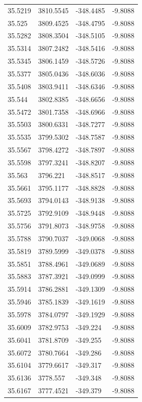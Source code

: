 \begin{table}[H]
\begin{tabular}{llll}
35.5219 & 3810.5545 & -348.4485 & -9.8088 \\
35.525 & 3809.4525 & -348.4795 & -9.8088 \\
35.5282 & 3808.3504 & -348.5105 & -9.8088 \\
35.5314 & 3807.2482 & -348.5416 & -9.8088 \\
35.5345 & 3806.1459 & -348.5726 & -9.8088 \\
35.5377 & 3805.0436 & -348.6036 & -9.8088 \\
35.5408 & 3803.9411 & -348.6346 & -9.8088 \\
35.544 & 3802.8385 & -348.6656 & -9.8088 \\
35.5472 & 3801.7358 & -348.6966 & -9.8088 \\
35.5503 & 3800.6331 & -348.7277 & -9.8088 \\
35.5535 & 3799.5302 & -348.7587 & -9.8088 \\
35.5567 & 3798.4272 & -348.7897 & -9.8088 \\
35.5598 & 3797.3241 & -348.8207 & -9.8088 \\
35.563 & 3796.221 & -348.8517 & -9.8088 \\
35.5661 & 3795.1177 & -348.8828 & -9.8088 \\
35.5693 & 3794.0143 & -348.9138 & -9.8088 \\
35.5725 & 3792.9109 & -348.9448 & -9.8088 \\
35.5756 & 3791.8073 & -348.9758 & -9.8088 \\
35.5788 & 3790.7037 & -349.0068 & -9.8088 \\
35.5819 & 3789.5999 & -349.0378 & -9.8088 \\
35.5851 & 3788.4961 & -349.0689 & -9.8088 \\
35.5883 & 3787.3921 & -349.0999 & -9.8088 \\
35.5914 & 3786.2881 & -349.1309 & -9.8088 \\
35.5946 & 3785.1839 & -349.1619 & -9.8088 \\
35.5978 & 3784.0797 & -349.1929 & -9.8088 \\
35.6009 & 3782.9753 & -349.224 & -9.8088 \\
35.6041 & 3781.8709 & -349.255 & -9.8088 \\
35.6072 & 3780.7664 & -349.286 & -9.8088 \\
35.6104 & 3779.6617 & -349.317 & -9.8088 \\
35.6136 & 3778.557 & -349.348 & -9.8088 \\
35.6167 & 3777.4521 & -349.379 & -9.8088 \\

\end{tabular}
\end{table}
